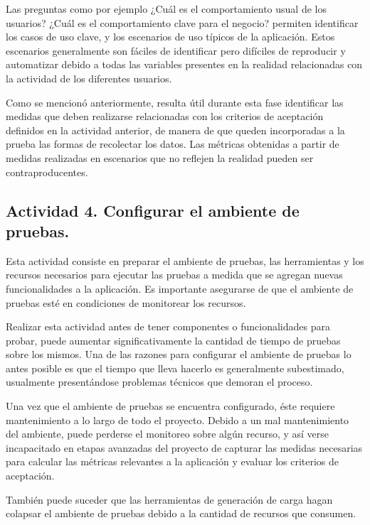 Las preguntas como por ejemplo ¿Cuál es el comportamiento usual de los usuarios? ¿Cuál es el comportamiento clave para el negocio? permiten identificar los casos de uso clave, y los escenarios de uso típicos de la aplicación. Estos escenarios generalmente son fáciles de identificar pero difíciles de reproducir y automatizar debido a todas las variables presentes en la realidad relacionadas con la actividad de los diferentes usuarios.

Como se mencionó anteriormente, resulta útil durante esta fase identificar las medidas que deben realizarse relacionadas con los criterios de aceptación definidos en la actividad anterior, de manera de que queden incorporadas a la prueba las formas de recolectar los datos. Las métricas obtenidas a partir de medidas realizadas en escenarios que no reflejen la realidad pueden ser contraproducentes.

\subsection{Actividad 4. Configurar el ambiente de pruebas.}
Esta actividad consiste en preparar el ambiente de pruebas, las herramientas y los recursos necesarios para ejecutar las pruebas a medida que se agregan nuevas funcionalidades a la aplicación. Es importante asegurarse de que el ambiente de pruebas esté en condiciones de monitorear los recursos.

Realizar esta actividad antes de tener componentes o funcionalidades para probar, puede aumentar significativamente la cantidad de tiempo de pruebas sobre los mismos. Una de las razones para configurar el ambiente de pruebas lo antes posible es que el tiempo que lleva hacerlo es generalmente subestimado, 
usualmente presentándose problemas técnicos que demoran el proceso.

Una vez que el ambiente de pruebas se encuentra configurado, éste requiere mantenimiento a lo largo de todo el proyecto. Debido a un mal mantenimiento del ambiente, puede perderse el monitoreo sobre algún recurso, y así verse incapacitado en etapas avanzadas del proyecto de capturar las medidas necesarias para calcular las métricas relevantes a la aplicación y evaluar los criterios de aceptación.

También puede suceder que las herramientas de generación de carga hagan colapsar el
ambiente de pruebas debido a la cantidad de recursos que consumen.


